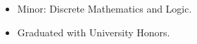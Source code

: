 \documentclass[margin, 10pt]{res} %
\begin{document}
\begin{resume}
\begin{itemize}
\item Minor: Discrete Mathematics and Logic.
\item Graduated with University Honors.
\end{itemize} 







\end{resume}
\end{document}
